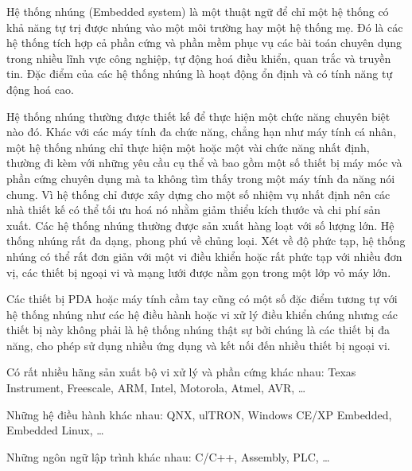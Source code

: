 
Hệ thống nhúng (Embedded system) là một thuật ngữ để chỉ một hệ thống có khả năng tự trị được nhúng vào một môi trường hay một hệ thống mẹ. Đó là các hệ thống tích hợp cả phần cứng và phần mềm phục vụ các bài toán chuyên dụng trong nhiều lĩnh vực công nghiệp, tự động hoá điều khiển, quan trắc và truyền tin. Đặc điểm của các hệ thống nhúng là hoạt động ổn định và có tính năng tự động hoá cao. \cite{giao-trinh}

Hệ thống nhúng thường được thiết kế để thực hiện một chức năng chuyên biệt nào đó. Khác với các máy tính đa chức năng, chẳng hạn như máy tính cá nhân, một hệ thống nhúng chỉ thực hiện một hoặc một vài chức năng nhất định, thường đi kèm với những yêu cầu cụ thể và bao gồm một số thiết bị máy móc và phần cứng chuyên dụng mà ta không tìm thấy trong một máy tính đa năng nói chung. Vì hệ thống chỉ được xây dựng cho một số nhiệm vụ nhất định nên các nhà thiết kế có thể tối ưu hoá nó nhằm giảm thiểu kích thước và chi phí sản xuất. Các hệ thống nhúng thường được sản xuất hàng loạt với số lượng lớn. Hệ thống nhúng rất đa dạng, phong phú về chủng loại. Xét về độ phức tạp, hệ thống nhúng có thể rất đơn giản với một vi điều khiển hoặc rất phức tạp với nhiều đơn vị, các thiết bị ngoại vi và mạng lưới được nằm gọn trong một lớp vỏ máy lớn.

Các thiết bị PDA hoặc máy tính cầm tay cũng có một số đặc điểm tương tự với hệ thống nhúng như các hệ điều hành hoặc vi xử lý điều khiển chúng nhưng các thiết bị này không phải là hệ thống nhúng thật sự bởi chúng là các thiết bị đa năng, cho phép sử dụng nhiều ứng dụng và kết nối đến nhiều thiết bị ngoại vi.

Có rất nhiều hãng sản xuất bộ vi xử lý và phần cứng khác nhau: Texas Instrument, Freescale, ARM, Intel, Motorola, Atmel, AVR, …

Những hệ điều hành khác nhau: QNX, ulTRON, Windows CE/XP Embedded, Embedded Linux, …

Những ngôn ngữ lập trình khác nhau: C/C++, Assembly, PLC, …
